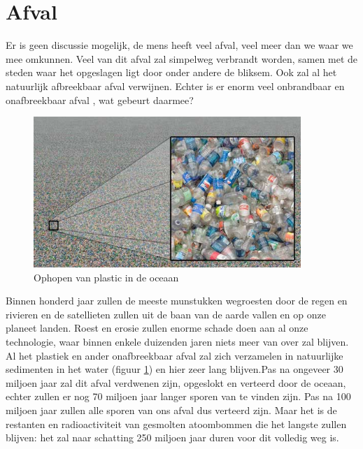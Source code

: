 \section{Afval}
Er is geen discussie mogelijk, de mens heeft veel afval, veel meer dan we waar we mee omkunnen. \cite{afval} Veel van dit afval zal simpelweg verbrandt worden, samen met de steden waar het opgeslagen ligt door onder andere de bliksem. Ook zal al het natuurlijk afbreekbaar afval verwijnen. Echter is er enorm veel onbrandbaar en onafbreekbaar afval \cite{ASAPScience}, wat gebeurt daarmee?\newline\newline
\begin{figure}
	\centering
	\includegraphics[width=0.9\textwidth]{plastic.jpg}
	\caption{Ophopen van plastic in de oceaan}
	\label{fig:plastic}
\end{figure}
Binnen honderd jaar zullen de meeste munstukken wegroesten door de regen en rivieren \cite{WorldWithoutUs} en de satellieten zullen uit de baan van de aarde vallen en op onze planeet landen. Roest en erosie zullen enorme schade doen aan al onze technologie, waar binnen enkele duizenden jaren niets meer van over zal blijven. \cite{standaard} Al het plastiek en ander onafbreekbaar afval zal zich verzamelen in natuurlijke sedimenten in het water (figuur \ref{fig:plastic}) en hier zeer lang blijven.\newpage Pas na ongeveer 30 miljoen jaar zal dit afval verdwenen zijn, opgeslokt en verteerd door de oceaan, echter zullen er nog 70 miljoen jaar langer sporen van te vinden zijn. Pas na 100 miljoen jaar zullen alle sporen van ons afval dus verteerd zijn.\cite{ASAPScience} \newline\newline
Maar het is de restanten en radioactiviteit van gesmolten atoombommen die het langste zullen blijven: het zal naar schatting 250 miljoen jaar duren voor dit volledig weg is. \cite{WorldWithoutUs}

